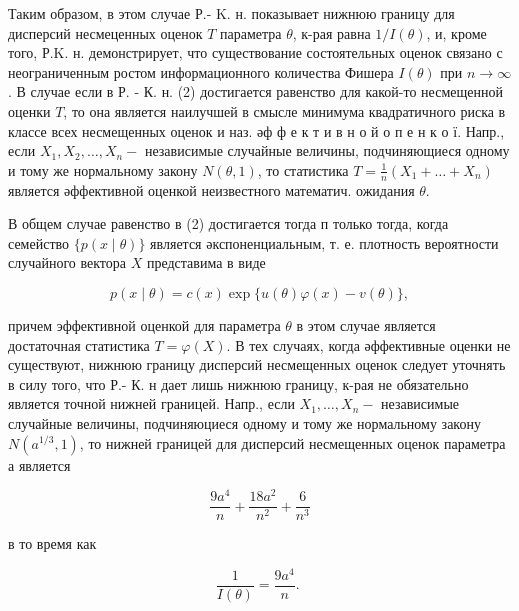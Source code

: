 \documentclass[10pt]{article}
\begin{document}
Таким образом, в этом случае Р.- K. н. показывает нижнюю границу для дисперсий несмеценных оценок $T$ параметра $\theta$, к-рая равна $1 / I(\theta)$, и, кроме того, Р.K. н. демонстрирует, что существование состоятельных оценок связано с неограниченным ростом информационного количества Фишера $I(\theta)$ при $n \rightarrow \infty$. В случае если в Р. - К. н. (2) достигается равенство для какой-то несмещенной оценки $T$, то она является наилучшей в смысле минимума квадратичного риска в классе всех несмещенных оценок и наз. әф ф е к т и в н о й о п е н к о ї. Напр., если $X_{1}, X_{2}, \ldots, X_{n}-$ независимые случайные величины, подчиняющиеся одному и тому же нормальному закону $N(\theta, 1)$, то статистика $T=\frac{1}{n}\left(X_{1}+\ldots+X_{n}\right)$ является әффективной оценкой неизвестного математич. ожидания $\theta$.



В общем случае равенство в (2) достигается тогда п только тогда, когда семейство $\{p(x \mid \theta)\}$ является әкспоненциальным, т. е. плотность вероятности случайного вектора $X$ представима в виде



\[

p(x \mid \theta)=c(x) \exp \{u(\theta) \varphi(x)-v(\theta)\},

\]



причем эффективной оценкой для параметра $\theta$ в этом случае является достаточная статистика $T=\varphi(X)$. В тех случаях, когда әффективные оценки не существуют, нижнюю границу дисперсий несмещенных оценок следует уточнять в силу того, что Р.- К. н дает лишь нижнюю границу, к-рая не обязательно является точной нижней границей. Напр., если $X_{1}, \ldots, X_{n}-$ независимые случайные величины, подчиняюциеся одному и тому же нормальному закону $N\left(a^{1 / 3}, 1\right)$, то нижней границей для дисперсий несмещенных оценок параметра $а$ является



\[

\frac{9 a^{4}}{n}+\frac{18 a^{2}}{n^{2}}+\frac{6}{n^{3}}

\]



в то время как



\[

\frac{1}{I(\theta)}=\frac{9 a^{4}}{n} \text {. }

\]
\end{document}
